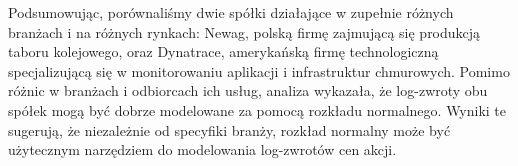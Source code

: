 \documentclass[a4paper,11pt]{article}
\begin{document}
Podsumowując, porównaliśmy dwie spółki działające w zupełnie różnych branżach i na różnych rynkach: Newag, polską firmę zajmującą się produkcją taboru kolejowego, oraz Dynatrace, amerykańską firmę technologiczną specjalizującą się w monitorowaniu aplikacji i infrastruktur chmurowych. Pomimo różnic w branżach i odbiorcach ich usług, analiza wykazała, że log-zwroty obu spółek mogą być dobrze modelowane za pomocą rozkładu normalnego. Wyniki te sugerują, że niezależnie od specyfiki branży, rozkład normalny może być użytecznym narzędziem do modelowania log-zwrotów cen akcji.
\end{document}
